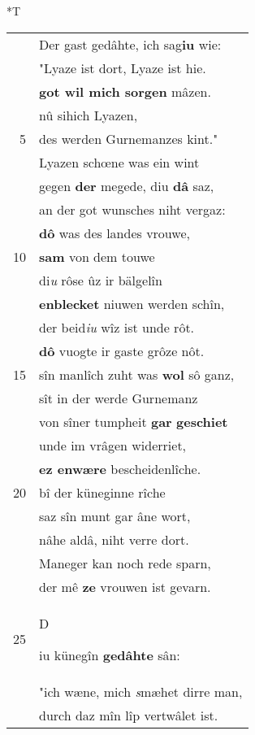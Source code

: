\documentclass[8pt,a4paper,notitlepage]{article}
\begin{document}
\begin{table}[ht]
\begin{minipage}[t]{0.5\linewidth}
\end{minipage}
\hspace{0.5cm}
\begin{minipage}[t]{0.5\linewidth}
\small
\begin{center}*T
\end{center}
\begin{tabular}{rl}
 & Der gast gedâhte, ich sag\textbf{iu} wie:\\ 
 & "Lyaze ist dort, Lyaze ist hie.\\ 
 & \textbf{got wil mich sorgen} mâzen.\\ 
 & nû sihich Lyazen,\\ 
5 & des werden Gurnemanzes kint."\\ 
 & Lyazen schœne was ein wint\\ 
 & gegen \textbf{der} megede, diu \textbf{dâ} saz,\\ 
 & an der got wunsches niht vergaz:\\ 
 & \textbf{dô} was des landes vrouwe,\\ 
10 & \textbf{sam} von dem touwe\\ 
 & di\textit{u} rôse ûz ir bälgelîn\\ 
 & \textbf{enblecket} niuwen werden schîn,\\ 
 & der beid\textit{iu} wîz ist unde rôt.\\ 
 & \textbf{dô} vuogte ir gaste grôze nôt.\\ 
15 & sîn manlîch zuht was \textbf{wol} sô ganz,\\ 
 & sît in der werde Gurnemanz\\ 
 & von sîner tumpheit \textbf{gar} \textbf{geschiet}\\ 
 & unde im vrâgen widerriet,\\ 
 & \textbf{ez enwære} bescheidenlîche.\\ 
20 & bî der küneginne rîche\\ 
 & saz sîn munt gar âne wort,\\ 
 & nâhe aldâ, niht verre dort.\\ 
 & Maneger kan noch rede sparn,\\ 
 & der mê \textbf{ze} vrouwen ist gevarn.\\ 
25 & \begin{large}D\end{large}iu künegîn \textbf{gedâhte} sân:\\ 
 & "ich wæne, mich \textit{s}mæhet dirre man,\\ 
 & durch daz mîn lîp vertwâlet ist.\\ 

\end{tabular}
\end{minipage}
\end{table}
\end{document}
